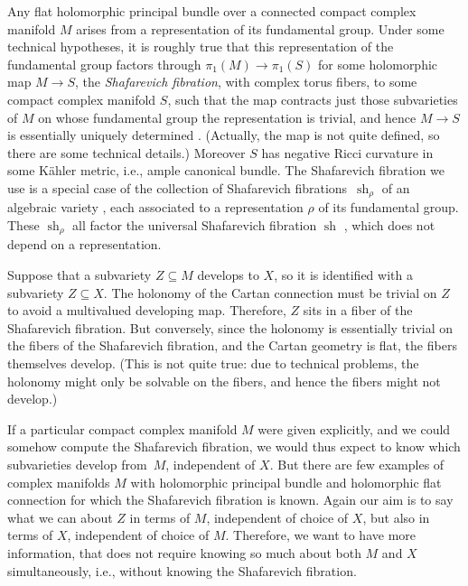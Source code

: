 \documentclass[10pt,a4paper]{amsart}
\numberwithin{equation}{section}
\begin{document}
Any flat holomorphic principal bundle over a connected compact complex manifold $M$ arises from a representation of its fundamental
group. Under some technical hypotheses, it is roughly true that this representation of the fundamental group factors through
$\pi_1(M) \to \pi_1(S)$ for some holomorphic map $M \to S$, the \emph{Shafarevich fibration}, with complex torus fibers, to some compact
complex manifold $S$, such that the map contracts just those subvarieties of $M$ on whose fundamental group the representation is
trivial, and hence $M\to S$ is essentially uniquely determined \cite{Kollar:1993,Zuo:1999}. (Actually, the map is not quite
defined, so there are some technical details.) Moreover $S$ has negative Ricci curvature in some K\"ahler metric, i.e., ample canonical
bundle.
The Shafarevich fibration we use is a special case of the collection of Shafarevich fibrations~$\operatorname{sh}_{\rho}$ of an algebraic variety \cite[p.~6]{Zuo:1999}, each associated to a representation $\rho$ of its fundamental group.
These $\operatorname{sh}_{\rho}$ all factor the universal Shafarevich fibration $\operatorname{sh}$ \cite[Definition 1]{Zuo:1999}, which does not depend on a representation.

Suppose that a subvariety $Z \subseteq M$ develops to $X$, so it is identified with a subvariety $Z \subseteq X$.
The holonomy of the Cartan connection must be trivial on $Z$ to avoid a multivalued developing map.
Therefore, $Z$ sits in a fiber of the Shafarevich fibration.
But conversely, since the holonomy is essentially trivial on the fibers of the Shafarevich fibration, and the Cartan geometry is
flat, the fibers themselves develop.
(This is not quite true: due to technical problems, the holonomy might only be solvable on the fibers, and hence the fibers might not develop.)

If a particular compact complex manifold $M$ were given explicitly, and we could somehow compute the Shafarevich fibration, we would
thus expect to know which subvarieties develop from~$M$, independent of $X$. But there are few examples of complex manifolds $M$
with holomorphic principal bundle and holomorphic flat connection for which the Shafarevich fibration is known. Again our aim is to say
what we can about $Z$ in terms of $M$, independent of choice of $X$, but also in terms of $X$, independent of choice of $M$.
Therefore, we want to have more information, that does not require knowing so much about both $M$ and $X$ simultaneously,
i.e., without knowing the Shafarevich fibration.
\end{document}
